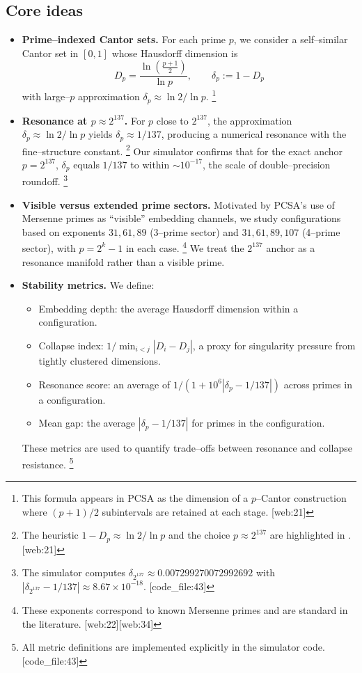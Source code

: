 \documentclass[11pt]{article}
\begin{document}
\subsection{Core ideas}

\begin{itemize}
  \item \textbf{Prime--indexed Cantor sets.}
  For each prime $p$, we consider a self--similar Cantor set in $[0,1]$ whose Hausdorff dimension is
  \[
    D_p = \frac{\ln\left( \frac{p+1}{2} \right)}{\ln p}, \qquad 
    \delta_p := 1 - D_p
  \]
  with large--$p$ approximation $\delta_p \approx \ln 2 / \ln p$.%
  \footnote{This formula appears in PCSA as the dimension of a $p$--Cantor construction where $(p+1)/2$ subintervals are retained at each stage. [web:21]} 

  \item \textbf{Resonance at $p \approx 2^{137}$.}
  For $p$ close to $2^{137}$, the approximation $\delta_p \approx \ln 2 / \ln p$ yields $\delta_p \approx 1/137$, producing a numerical resonance with the fine--structure constant.%
  \footnote{The heuristic $1-D_p\approx\ln 2/\ln p$ and the choice $p\approx 2^{137}$ are highlighted in \cite{pcsa_gist}. [web:21]} 
  Our simulator confirms that for the exact anchor $p = 2^{137}$, $\delta_p$ equals $1/137$ to within $\sim 10^{-17}$, the scale of double--precision roundoff.%
  \footnote{The simulator computes $\delta_{2^{137}} \approx 0.007299270072992692$ with $|\delta_{2^{137}} - 1/137|\approx 8.67\times 10^{-18}$. [code\_file:43]} 

  \item \textbf{Visible versus extended prime sectors.}
  Motivated by PCSA's use of Mersenne primes as ``visible'' embedding channels, we study configurations based on exponents $31,61,89$ (3--prime sector) and $31,61,89,107$ (4--prime sector), with $p=2^k-1$ in each case.%
  \footnote{These exponents correspond to known Mersenne primes and are standard in the literature. [web:22][web:34]} 
  We treat the $2^{137}$ anchor as a resonance manifold rather than a visible prime.

  \item \textbf{Stability metrics.}
  We define:
  \begin{itemize}
    \item Embedding depth: the average Hausdorff dimension within a configuration.
    \item Collapse index: $1/\min_{i<j}|D_i - D_j|$, a proxy for singularity pressure from tightly clustered dimensions.
    \item Resonance score: an average of $1/(1+10^6|\delta_p - 1/137|)$ across primes in a configuration.
    \item Mean gap: the average $|\delta_p - 1/137|$ for primes in the configuration.
  \end{itemize}
  These metrics are used to quantify trade--offs between resonance and collapse resistance.%
  \footnote{All metric definitions are implemented explicitly in the simulator code. [code\_file:43]} 
\end{itemize}
\end{document}
